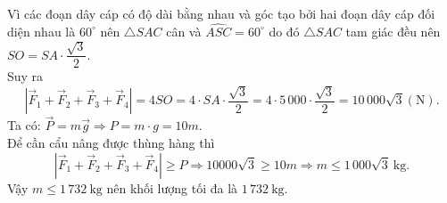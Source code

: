 \begin{bt}
{		Vì các đoạn dây cáp có độ dài bằng nhau và góc tạo bởi hai đoạn dây  cáp đối diện nhau là $60^{\circ}$ nên $\triangle SAC$ cân và $\widehat{ASC}=60^{\circ}$ do đó $\triangle SAC$ tam giác đều nên $SO = SA \cdot \dfrac{\sqrt{3}}{2}$.\\
		 Suy ra
		\[\left|\overrightarrow{F}_{1}+\overrightarrow{F}_{2}+\overrightarrow{F}_{3}+\overrightarrow{F}_{4}\right|=4 S O=4  \cdot S A \cdot \dfrac{\sqrt{3}}{2}=4 \cdot 5\,000 \cdot \dfrac{\sqrt{3}}{2}=10\,000 \sqrt{3} (\mathrm{N}).\]
		Ta có:  $\overrightarrow{P}=m \overrightarrow{g} \Rightarrow P=m \cdot g=10 m$.\\
		Để cần  cẩu nâng được thùng hàng thì
		\[\left|\overrightarrow{F}_{1}+\overrightarrow{F}_{2}+\overrightarrow{F}_{3}+\overrightarrow{F}_{4}\right| \geq P \Rightarrow 10000  \sqrt{3} \geq 10 m \Rightarrow m \leq 1\,000 \sqrt{3} \mathrm{~kg}.\]
		Vậy $m \leq 1\,732 \mathrm{~kg}$ nên khối lượng tối đa  là $1\,732 \mathrm{~kg}$.
	 }
\end{bt}

